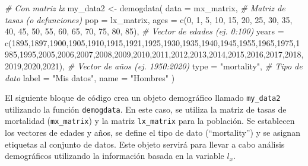 \documentclass[
]{article}
\newenvironment{Shaded}{\begin{snugshade}}{\end{snugshade}}
\newcommand{\AttributeTok}[1]{\textcolor[rgb]{0.77,0.63,0.00}{#1}}
\newcommand{\CommentTok}[1]{\textcolor[rgb]{0.56,0.35,0.01}{\textit{#1}}}
\newcommand{\DecValTok}[1]{\textcolor[rgb]{0.00,0.00,0.81}{#1}}
\newcommand{\FunctionTok}[1]{\textcolor[rgb]{0.00,0.00,0.00}{#1}}
\newcommand{\NormalTok}[1]{#1}
\newcommand{\OtherTok}[1]{\textcolor[rgb]{0.56,0.35,0.01}{#1}}
\newcommand{\StringTok}[1]{\textcolor[rgb]{0.31,0.60,0.02}{#1}}
\begin{document}
\begin{Shaded}
\begin{Highlighting}[]
\CommentTok{\# Con matriz lx}
\NormalTok{my\_data2 }\OtherTok{\textless{}{-}} \FunctionTok{demogdata}\NormalTok{(}
  \AttributeTok{data =}\NormalTok{ mx\_matrix,           }\CommentTok{\# Matriz de tasas (o defunciones)}
  \AttributeTok{pop =}\NormalTok{ lx\_matrix,}
  \AttributeTok{ages =} \FunctionTok{c}\NormalTok{(}\DecValTok{0}\NormalTok{, }\DecValTok{1}\NormalTok{, }\DecValTok{5}\NormalTok{, }\DecValTok{10}\NormalTok{, }\DecValTok{15}\NormalTok{, }\DecValTok{20}\NormalTok{, }\DecValTok{25}\NormalTok{, }\DecValTok{30}\NormalTok{, }\DecValTok{35}\NormalTok{, }\DecValTok{40}\NormalTok{, }\DecValTok{45}\NormalTok{, }\DecValTok{50}\NormalTok{, }\DecValTok{55}\NormalTok{, }\DecValTok{60}\NormalTok{, }\DecValTok{65}\NormalTok{, }\DecValTok{70}\NormalTok{, }\DecValTok{75}\NormalTok{, }\DecValTok{80}\NormalTok{, }\DecValTok{85}\NormalTok{),       }\CommentTok{\# Vector de edades (ej. 0:100)}
  \AttributeTok{years =} \FunctionTok{c}\NormalTok{(}\DecValTok{1895}\NormalTok{,}\DecValTok{1897}\NormalTok{,}\DecValTok{1900}\NormalTok{,}\DecValTok{1905}\NormalTok{,}\DecValTok{1910}\NormalTok{,}\DecValTok{1915}\NormalTok{,}\DecValTok{1921}\NormalTok{,}\DecValTok{1925}\NormalTok{,}\DecValTok{1930}\NormalTok{,}\DecValTok{1935}\NormalTok{,}\DecValTok{1940}\NormalTok{,}\DecValTok{1945}\NormalTok{,}\DecValTok{1955}\NormalTok{,}\DecValTok{1965}\NormalTok{,}\DecValTok{1975}\NormalTok{,}\DecValTok{1985}\NormalTok{,}\DecValTok{1995}\NormalTok{,}\DecValTok{2005}\NormalTok{,}\DecValTok{2006}\NormalTok{,}\DecValTok{2007}\NormalTok{,}\DecValTok{2008}\NormalTok{,}\DecValTok{2009}\NormalTok{,}\DecValTok{2010}\NormalTok{,}\DecValTok{2011}\NormalTok{,}\DecValTok{2012}\NormalTok{,}\DecValTok{2013}\NormalTok{,}\DecValTok{2014}\NormalTok{,}\DecValTok{2015}\NormalTok{,}\DecValTok{2016}\NormalTok{,}\DecValTok{2017}\NormalTok{,}\DecValTok{2018}\NormalTok{,}\DecValTok{2019}\NormalTok{,}\DecValTok{2020}\NormalTok{,}\DecValTok{2021}\NormalTok{),        }\CommentTok{\# Vector de años (ej. 1950:2020)}
  \AttributeTok{type =} \StringTok{"mortality"}\NormalTok{,  }\CommentTok{\# Tipo de dato}
  \AttributeTok{label =} \StringTok{"Mis datos"}\NormalTok{,}
  \AttributeTok{name =} \StringTok{"Hombres"}
\NormalTok{)}
\end{Highlighting}
\end{Shaded}

El siguiente bloque de código crea un objeto demográfico llamado
\texttt{my\_data2} utilizando la función \texttt{demogdata}. En este
caso, se utiliza la matriz de tasas de mortalidad (\texttt{mx\_matrix})
y la matriz \texttt{lx\_matrix} para la población. Se establecen los
vectores de edades y años, se define el tipo de dato (``mortality'') y
se asignan etiquetas al conjunto de datos. Este objeto servirá para
llevar a cabo análisis demográficos utilizando la información basada en
la variable \(l_x\).
\end{document}
